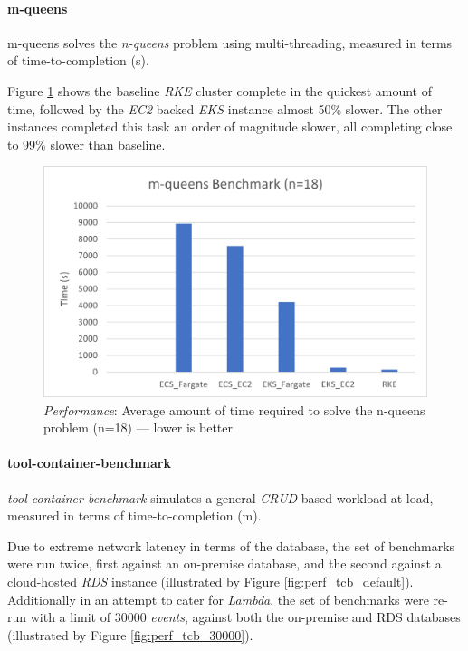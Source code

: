 \paragraph{m-queens}
m-queens solves the \emph{n-queens} problem using multi-threading, measured in terms of time-to-completion (s).

Figure \ref{fig:perf_mQueens} shows the baseline \textit{RKE} cluster complete in the quickest amount of time,
followed by the \textit{EC2} backed \textit{EKS} instance almost 50\% slower.
The other instances completed this task an order of magnitude slower, all completing close to 99\% slower than baseline.

\begin{figure}[htbp]
  \includegraphics[width=\textwidth]{images/perf-m_queens.png}
  \caption{\emph{Performance}: Average amount of time required to solve the n-queens problem (n=18) --- lower is better}
  \label{fig:perf_mQueens}
\end{figure}

\paragraph{tool-container-benchmark}
\emph{tool-container-benchmark} simulates a general \textit{CRUD} based workload at load, measured in terms of time-to-completion (m).

Due to extreme network latency in terms of the database, the set of benchmarks were run twice,
first against an on-premise database, and the second against a cloud-hosted \textit{RDS} instance (illustrated by Figure \ref{fig:perf_tcb_default}).
Additionally in an attempt to cater for \textit{Lambda}, the set of benchmarks were re-run with a limit of 30000 \emph{events},
against both the on-premise and RDS databases
(illustrated by Figure \ref{fig:perf_tcb_30000}).

